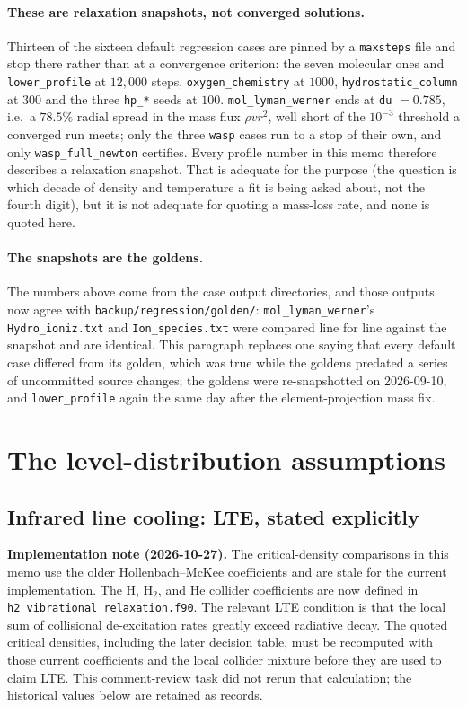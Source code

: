 \documentclass[english,a4paper]{my_memo}
\begin{document}
\paragraph{These are relaxation snapshots, not converged solutions.}
Thirteen of the sixteen default regression cases are pinned by a
\texttt{maxsteps} file and stop there rather than at a convergence criterion:
the seven molecular ones and \texttt{lower\_profile} at $12{,}000$ steps,
\texttt{oxygen\_chemistry} at $1000$, \texttt{hydrostatic\_column} at $300$
and the three \texttt{hp\_*} seeds at $100$. \texttt{mol\_lyman\_werner} ends
at \texttt{du} $= 0.785$, i.e.\ a $78.5\%$ radial spread in the mass flux
$\rho v r^2$, well short of the $10^{-3}$ threshold a converged run meets;
only the three \texttt{wasp} cases run to a stop of their own, and only
\texttt{wasp\_full\_newton} certifies. Every profile number in this memo
therefore describes a relaxation snapshot. That is adequate for the purpose
(the question is which decade of density and temperature a fit is being asked
about, not the fourth digit), but it is not adequate for quoting a mass-loss
rate, and none is quoted here.

\paragraph{The snapshots are the goldens.} The numbers above come from the
case output directories, and those outputs now agree with
\texttt{backup/regression/golden/}: \texttt{mol\_lyman\_werner}'s
\texttt{Hydro\_ioniz.txt} and \texttt{Ion\_species.txt} were compared line for
line against the snapshot and are identical. This paragraph replaces one
saying that every default case differed from its golden, which was true while
the goldens predated a series of uncommitted source changes; the goldens were
re-snapshotted on 2026-09-10, and \texttt{lower\_profile} again the same day
after the element-projection mass fix.

\section{The level-distribution assumptions}

\subsection{Infrared line cooling: LTE, stated explicitly}

\noindent\textbf{Implementation note (2026-10-27).}
The critical-density comparisons in this memo use the older Hollenbach--McKee
coefficients and are stale for the current implementation. The H, H$_2$, and
He collider coefficients are now defined in
\texttt{h2\_vibrational\_relaxation.f90}. The relevant LTE condition is that
the local sum of collisional de-excitation rates greatly exceed radiative
decay. The quoted critical densities, including the later decision table,
must be recomputed with those current coefficients and the local collider
mixture before they are used to claim LTE. This comment-review task did not
rerun that calculation; the historical values below are retained as records.
\end{document}
